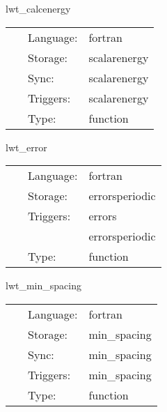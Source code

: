 \documentclass{article}
\begin{document}
\vspace{5mm}


\hspace{5mm} lwt\_calcenergy 

\hspace{5mm}{\it calculate the energy of the scalar field } 


\hspace{5mm}

 \begin{tabular*}{160mm}{cll} 
~ & Language:  & fortran \\ 
~ & Storage:  & scalarenergy \\ 
~ & Sync:  & scalarenergy \\ 
~ & Triggers:  & scalarenergy \\ 
~ & Type:  & function \\ 
\end{tabular*} 


\vspace{5mm}


\hspace{5mm} lwt\_error 

\hspace{5mm}{\it calculate errors of the solution } 


\hspace{5mm}

 \begin{tabular*}{160mm}{cll} 
~ & Language:  & fortran \\ 
~ & Storage:  & errorsperiodic \\ 
~ & Triggers:  & errors \\ 
~& ~ &errorsperiodic\\ 
~ & Type:  & function \\ 
\end{tabular*} 


\vspace{5mm}


\hspace{5mm} lwt\_min\_spacing 

\hspace{5mm}{\it calculate the smallest grid spacing } 


\hspace{5mm}

 \begin{tabular*}{160mm}{cll} 
~ & Language:  & fortran \\ 
~ & Storage:  & min\_spacing \\ 
~ & Sync:  & min\_spacing \\ 
~ & Triggers:  & min\_spacing \\ 
~ & Type:  & function \\ 
\end{tabular*} 
\end{document}
